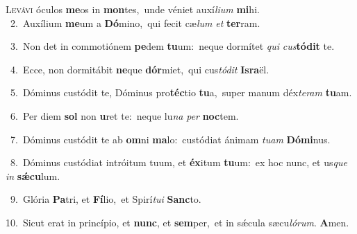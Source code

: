 \lettrine{\initial\textcolor{\initialcolor}{L}}{evávi} óculos \textbf{me}\-os in \textbf{mon}\-tes,~\star unde véniet auxí\-\textit{li}\-\textit{um} \textbf{mi}\-hi.\\
{\numbfont\textcolor{\numbcolor}{~2.}}~Auxílium \textbf{me}\-um a \textbf{Dó}\-mino,~\star qui fecit cæ\textit{lum} \textit{et} \textbf{ter}\-ram.\par
{\numbfont\textcolor{\numbcolor}{~3.}}~Non det in commotiónem \textbf{pe}\-dem \textbf{tu}\-um:~\star neque dormítet \textit{qui} \textit{cus}\-\textbf{tó}\textbf{dit} te.\par
{\numbfont\textcolor{\numbcolor}{~4.}}~Ecce, non dormitábit \textbf{ne}\-que \textbf{dór}\-miet,~\star qui cus\-\textit{tó}\-\textit{dit} \textbf{Is}\-\textbf{ra}ël.\par
{\numbfont\textcolor{\numbcolor}{~5.}}~Dóminus custódit te, Dóminus pro\-\textbf{téc}\-tio \textbf{tu}\-a,~\star super manum déx\-\textit{te}\-\textit{ram} \textbf{tu}\-am.\par
{\numbfont\textcolor{\numbcolor}{~6.}}~Per diem \textbf{sol} non \textbf{u}\-ret te:~\star neque lu\textit{na} \textit{per} \textbf{noc}\-tem.\par
{\numbfont\textcolor{\numbcolor}{~7.}}~Dóminus custódit te ab \textbf{om}\-ni \textbf{ma}\-lo:~\star custódiat ánimam \textit{tu}\-\textit{am} \textbf{Dó}\-\textbf{mi}nus.\par
{\numbfont\textcolor{\numbcolor}{~8.}}~Dóminus custódiat intróitum tuum, et \textbf{éx}\-itum \textbf{tu}\-um:~\star ex hoc nunc, et us\textit{que} \textit{in} \textbf{sǽ}\-\textbf{cu}lum.\par
{\numbfont\textcolor{\numbcolor}{~9.}}~Glória \textbf{Pa}\-tri, et \textbf{Fí}\-lio,~\star et Spirí\-\textit{tu}\-\textit{i} \textbf{Sanc}\-to.\par
{\numbfont\textcolor{\numbcolor}{10.}}~Sicut erat in princípio, et \textbf{nunc}\-, et \textbf{sem}\-per,~\star et in sǽcula sæcu\-\textit{ló}\-\textit{rum}. \textbf{A}\-men.\par
